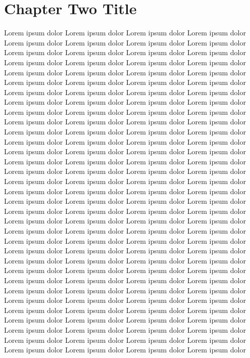 \chapter{Chapter Two Title}


Lorem ipsum dolor
Lorem ipsum dolor
Lorem ipsum dolor
Lorem ipsum dolor
Lorem ipsum dolor
Lorem ipsum dolor
Lorem ipsum dolor
Lorem ipsum dolor
Lorem ipsum dolor
Lorem ipsum dolor
Lorem ipsum dolor
Lorem ipsum dolor
Lorem ipsum dolor
Lorem ipsum dolor
Lorem ipsum dolor
Lorem ipsum dolor
Lorem ipsum dolor
Lorem ipsum dolor
Lorem ipsum dolor
Lorem ipsum dolor
Lorem ipsum dolor
Lorem ipsum dolor
Lorem ipsum dolor
Lorem ipsum dolor
Lorem ipsum dolor
Lorem ipsum dolor
Lorem ipsum dolor
Lorem ipsum dolor
Lorem ipsum dolor
Lorem ipsum dolor
Lorem ipsum dolor
Lorem ipsum dolor
Lorem ipsum dolor
Lorem ipsum dolor
Lorem ipsum dolor
Lorem ipsum dolor
Lorem ipsum dolor
Lorem ipsum dolor
Lorem ipsum dolor
Lorem ipsum dolor
Lorem ipsum dolor
Lorem ipsum dolor
Lorem ipsum dolor
Lorem ipsum dolor
Lorem ipsum dolor
Lorem ipsum dolor
Lorem ipsum dolor
Lorem ipsum dolor
Lorem ipsum dolor
Lorem ipsum dolor
Lorem ipsum dolor
Lorem ipsum dolor
Lorem ipsum dolor
Lorem ipsum dolor
Lorem ipsum dolor
Lorem ipsum dolor
Lorem ipsum dolor
Lorem ipsum dolor
Lorem ipsum dolor
Lorem ipsum dolor
Lorem ipsum dolor
Lorem ipsum dolor
Lorem ipsum dolor
Lorem ipsum dolor
Lorem ipsum dolor
Lorem ipsum dolor
Lorem ipsum dolor
Lorem ipsum dolor
Lorem ipsum dolor
Lorem ipsum dolor
Lorem ipsum dolor
Lorem ipsum dolor
Lorem ipsum dolor
Lorem ipsum dolor
Lorem ipsum dolor
Lorem ipsum dolor
Lorem ipsum dolor
Lorem ipsum dolor
Lorem ipsum dolor
Lorem ipsum dolor
Lorem ipsum dolor
Lorem ipsum dolor
Lorem ipsum dolor
Lorem ipsum dolor
Lorem ipsum dolor
Lorem ipsum dolor
Lorem ipsum dolor
Lorem ipsum dolor
Lorem ipsum dolor
Lorem ipsum dolor
Lorem ipsum dolor
Lorem ipsum dolor
Lorem ipsum dolor
Lorem ipsum dolor
Lorem ipsum dolor
Lorem ipsum dolor
Lorem ipsum dolor
Lorem ipsum dolor
Lorem ipsum dolor
Lorem ipsum dolor
Lorem ipsum dolor
Lorem ipsum dolor
Lorem ipsum dolor
Lorem ipsum dolor
Lorem ipsum dolor
Lorem ipsum dolor
Lorem ipsum dolor
Lorem ipsum dolor
Lorem ipsum dolor
Lorem ipsum dolor
Lorem ipsum dolor
Lorem ipsum dolor
Lorem ipsum dolor
Lorem ipsum dolor
Lorem ipsum dolor
Lorem ipsum dolor
Lorem ipsum dolor
Lorem ipsum dolor
Lorem ipsum dolor
Lorem ipsum dolor
Lorem ipsum dolor
Lorem ipsum dolor
Lorem ipsum dolor
Lorem ipsum dolor
Lorem ipsum dolor
Lorem ipsum dolor
Lorem ipsum dolor
Lorem ipsum dolor
Lorem ipsum dolor
Lorem ipsum dolor
Lorem ipsum dolor
Lorem ipsum dolor
